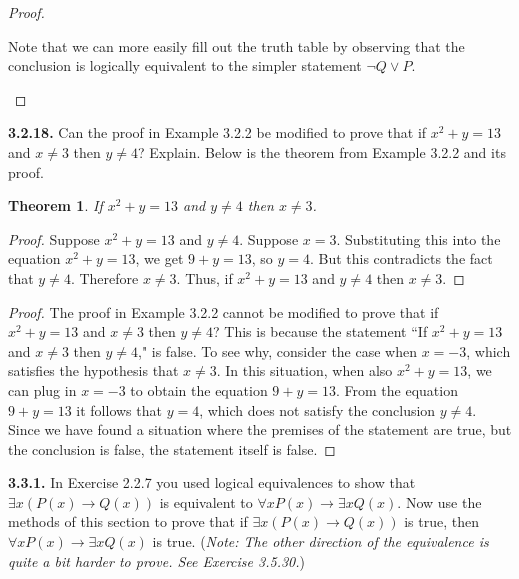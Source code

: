 \documentclass[12pt]{amsart}
\newenvironment{statement}[1]{\smallskip\noindent\color[rgb]{.6627, .3529, .6314} {\bf #1.}}{}
\newtheorem{theorem}{Theorem}
\theoremstyle{definition}
\theoremstyle{remark}
\begin{document}
\begin{proof}
\begin{enumerate}
	Note that we can more easily fill out the truth table by observing that the conclusion
	is logically equivalent to the simpler statement $\neg Q \vee P$.
\end{enumerate}
\end{proof}


\begin{statement}{3.2.18}
Can the proof in Example 3.2.2 be modified to prove that if $x^2 + y = 13$ and $x \neq 3$ then $y \neq 4$?
Explain.
Below is the theorem from Example 3.2.2 and its proof.
\begin{theorem}
	If $x^2 + y = 13$ and $y \neq 4$ then $x \neq 3$.
\end{theorem}
\begin{proof}
	Suppose $x^2 + y = 13$ and $y \neq 4$.
	Suppose $x = 3$.
	Substituting this into the equation $x^2 + y = 13$, we get $9 + y = 13$, so $y = 4$.
	But this contradicts the fact that $y \neq 4$.
	Therefore $x \neq 3$.
	Thus, if $x^2 + y = 13$ and $y \neq 4$ then $x \neq 3$.
\end{proof}
\end{statement}

\begin{proof}
The proof in Example 3.2.2 cannot be modified to prove that if $x^2 + y = 13$ and $x \neq 3$ then $y \neq 4$?
This is because the statement ``If $x^2 + y = 13$ and $x \neq 3$ then $y \neq 4$," is false.
To see why, consider the case when $x = -3$, which satisfies the hypothesis that $x \neq 3$.
In this situation, when also $x^2 + y = 13$, we can plug in $x = -3$ to obtain the equation $9 + y = 13$.
From the equation $9 + y = 13$ it follows that $y = 4$, which does not satisfy the conclusion $y \neq 4$.
Since we have found a situation where the premises of the statement are true, but the conclusion is false, the statement itself is false.
\end{proof}


\begin{statement}{3.3.1}
In Exercise 2.2.7 you used logical equivalences to show that $\exists x (P(x) \rightarrow Q(x))$ is equivalent to $\forall x P(x) \rightarrow \exists x Q(x)$.
Now use the methods of this section to prove that if $\exists x (P(x) \rightarrow Q(x))$ is true, then $\forall x P(x) \rightarrow \exists x Q(x)$ is true.
(\emph{Note: The other direction of the equivalence is quite a bit harder to prove.
See Exercise 3.5.30.})
\end{statement}
\end{document}
